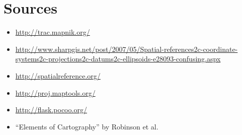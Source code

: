 \documentclass[letterpaper]{article}
\begin{document}
\pagebreak

\section{Sources}

\begin{itemize}
\item \url{http://trac.mapnik.org/}
\item \url{http://www.sharpgis.net/post/2007/05/Spatial-references2c-coordinate-systems2c-projections2c-datums2c-ellipsoids-e28093-confusing.aspx}
\item \url{http://spatialreference.org/}
\item \url{http://proj.maptools.org/}
\item \url{http://flask.pocoo.org/}
\item ``Elements of Cartography'' by Robinson et al.
\end{itemize}
\end{document}
